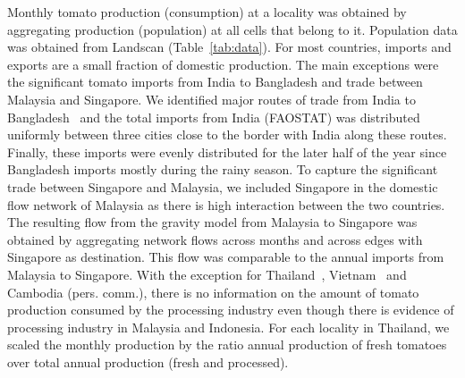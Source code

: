 \documentclass[10pt]{article}
\theoremstyle{definition}
\begin{document}
Monthly tomato production (consumption) at a locality was obtained by aggregating
production (population) at all cells that belong to it. Population data was
obtained from Landscan (Table~\ref{tab:data}).
For most countries, imports and exports are a small fraction of domestic
production. The main
exceptions were the significant tomato imports from India to Bangladesh and
trade between Malaysia and Singapore. We identified major routes of trade
from India to Bangladesh~\cite{EIIndia2015} and the total imports from
India (FAOSTAT) was distributed uniformly between three cities close to the
border with India along these routes. Finally, these imports were evenly
distributed for the later half of the year since Bangladesh imports mostly
during the rainy season. To capture the significant trade between Singapore
and Malaysia, we included Singapore in the domestic flow network of
Malaysia as there is high interaction between the two countries.  The
resulting flow from the gravity model from Malaysia to Singapore was
obtained by aggregating network flows across months and across edges with
Singapore as destination. This flow was comparable to the annual imports
from Malaysia to Singapore. With the exception for
Thailand~\cite{mict2013}, Vietnam~\cite{wijk2007} and Cambodia (pers.
comm.), there is no information on the amount of tomato production consumed
by the processing industry even though there is evidence of processing
industry in Malaysia and Indonesia. For each locality in Thailand, we
scaled the monthly production by the ratio annual production of fresh
tomatoes over total annual production (fresh and processed).
\end{document}
